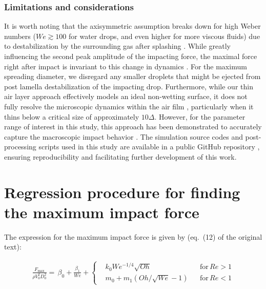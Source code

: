 \documentclass[reprint,amssymb,superscriptaddress,aps,prfluids,onecolumn]{revtex4-1}
\begin{document}
\subsubsection{Limitations and considerations}
It is worth noting that the axisymmetric assumption breaks down for high Weber numbers ($We \gtrsim 100$ for water drops, and even higher for more viscous fluids) due to destabilization by the surrounding gas after splashing \citep{xu2005drop,Eggers2010,Driscoll2011,riboux2014experiments,Josserand2016,sanjayzhang2022prl}. While greatly influencing the second peak amplitude of the impacting force, the maximal force right after impact is invariant to this change in dynamics \cite{sanjayzhang2022prl,sanjay2024inertia}. For the maximum spreading diameter, we disregard any smaller droplets that might be ejected from post lamella destabilization of the impacting drop. 
Furthermore, while our thin air layer approach effectively models an ideal non-wetting surface, it does not fully resolve the microscopic dynamics within the air film \cite{kolinski-2014-epl,sprittles2024gas}, particularly when it thins below a critical size of approximately $10\Delta$. However, for the parameter range of interest in this study, this approach has been demonstrated to accurately capture the macroscopic impact behavior \citep{ramirez2020lifting,sanjay2023drop,alventosa2023inertio,garcia2024skating}.
The simulation source codes and post-processing scripts used in this study are available in a public GitHub repository \citep{basiliskVatsal}, ensuring reproducibility and facilitating further development of this work.

\section{Regression procedure for finding the maximum impact force}

The expression for the maximum impact force is given by (eq.~(12) of the original text):

\begin{align}
	\label{supp:eq:FinalFmax}
	\frac{F_{\text{max}}}{\rho V_0^2D_0^2} =\, \beta_0 + \frac{\beta_1}{We} + \left\{ \begin{aligned} 
		&k_0 We^{-1/4}\sqrt{Oh} && \text{for}\,Re > 1\\ 
		&m_0 + m_1\left(Oh/\sqrt{We} - 1\right) && \text{for}\,Re < 1 
	\end{aligned} \right.
\end{align}
\end{document}
